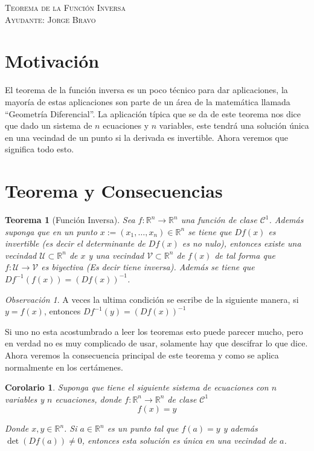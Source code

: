 \documentclass[a4paper,oneside,10.5pt]{article}
\newcommand\RR{\mathbb{R}}
\theoremstyle{definition}
\theoremstyle{plain}
\newtheorem{teo}[defi]{Teorema}
\newtheorem{coro}[defi]{Corolario}
\theoremstyle{remark}
\newtheorem{obs}[defi]{Observación}
\theoremstyle{theorem}
\begin{document}
\begin{center}
{\Large \textsc{Teorema de la Función Inversa}}\\
\vspace{1em}
\textsc{Ayudante: Jorge Bravo}\\
\end{center}

\section*{Motivación}
El teorema de la función inversa es un poco técnico para dar aplicaciones, la mayoría de estas aplicaciones son parte de un área de la matemática llamada ``Geometría Diferencial''. La aplicación típica que se da de este teorema nos dice que dado un sistema de $n$ ecuaciones y $n$ variables, este tendrá una solución única en una vecindad de un punto si la derivada es invertible. Ahora veremos que significa todo esto.

\section*{Teorema y Consecuencias}
\begin{teo}[Función Inversa]
Sea $f : \RR^n \to \RR^n$ una función de clase $\mathcal{C}^1$. Además suponga que en un punto $x := (x_1, \dots, x_n) \in \RR^n$ se tiene que $Df(x)$ es invertible (es decir el determinante de $Df(x)$ es no nulo), entonces existe una vecindad $\mathcal{U} \subset \RR^n$ de $x$ y una vecindad $\mathcal{V} \subset \RR^n$ de $f(x)$ de tal forma que $f : \mathcal{U} \to \mathcal{V}$ es biyectiva (Es decir tiene inversa). Además se tiene que $Df^{-1}(f(x)) = {(Df(x))}^{-1}$.
\end{teo}

\begin{obs}
    A veces la ultima condición se escribe de la siguiente manera, si $y = f(x)$, entonces $Df^{-1}(y) = {(Df(x))}^{-1}$
\end{obs}

Si uno no esta acostumbrado a leer los teoremas esto puede parecer mucho, pero en verdad no es muy complicado de usar, solamente hay que descifrar lo que dice. Ahora veremos la consecuencia principal de este teorema y como se aplica normalmente en los certámenes.

\begin{coro}
    Suponga que tiene el siguiente sistema de ecuaciones con $n$ variables y $n$ ecuaciones, donde $f: \RR^n \to \RR^n$ de clase $\mathcal{C}^1$
    \begin{equation*}
        f(x) = y
    \end{equation*}

    Donde $x, y \in \RR^n$. Si $a \in \RR^n$ es un punto tal que $f(a) = y$ y además $\det(Df(a)) \neq 0$, entonces esta solución es única en una vecindad de $a$.
\end{coro}
\end{document}
